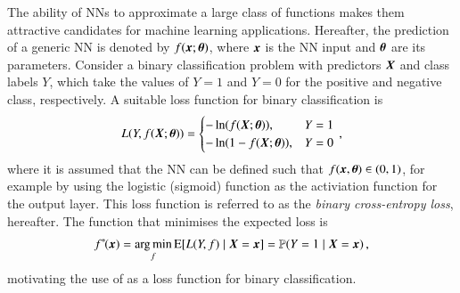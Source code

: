 The ability of NNs to approximate a large class of functions makes them
attractive candidates for machine learning applications. Hereafter, the
prediction of a generic NN is denoted by $f(\myvec{x}; \myvec{\theta})$, where
$\myvec{x}$ is the NN input and $\myvec{\theta}$ are its parameters. Consider a
binary classification problem with predictors $\myvec{X}$ and class labels $Y$,
which take the values of $Y = 1$ and $Y = 0$ for the positive and negative
class, respectively. A suitable loss function for binary classification is
\begin{align}
  L(Y, f(\myvec{X}; \myvec{\theta})) =
  \begin{cases}
    -\ln\mathopen{}\left( f(\myvec{X}; \myvec{\theta}) \right)\mathclose{},       & Y = 1 \\
    -\ln\mathopen{}\left( 1 - f(\myvec{X}; \myvec{\theta}) \right)\mathclose{},   & Y = 0 \\
  \end{cases} \,\text{,}
  \label{eq:loss_bce}
\end{align}
where it is assumed that the NN can be defined such that
$f(\myvec{x}, \myvec{\theta}) \in (0, 1)$, for example by using the logistic
(sigmoid) function as the activiation function for the output layer. This loss
function is referred to as the \emph{binary cross-entropy loss}, hereafter. The
function that minimises the expected loss is
\begin{align*}
  f^{*\!}(\myvec{x})
  = \argmin_{f} \expect[ L(Y, f) \mid \myvec{X} = \myvec{x} ]
  = \mathbb{P}(Y = 1 \mid \myvec{X} = \myvec{x}) \,\text{,}
\end{align*}
motivating the use of  as a loss function for binary
classification.





